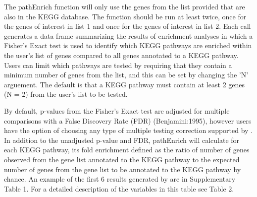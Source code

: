 \documentclass[article]{jss}\usepackage[]{graphicx}\usepackage[]{color}
\begin{document}
The pathEnrich function will only use the genes from the list provided that are
also in the KEGG database. The  function should be run at least
twice, once for the genes of interest in list 1 and once for the genes of
interest in list 2. Each  call generates a data frame
summarizing the results of enrichment analyses in which a Fisher’s Exact test is
used to identify which KEGG pathways are enriched within the user’s list of
genes compared to all genes annotated to a KEGG pathway. Users can limit which
pathways are tested by requiring that they contain a minimum number of genes
from the list, and this can be set by changing the 'N' arguement. The default is
that a KEGG pathway must contain at least 2 genes (N = 2) from the user’s list
to be tested.



By default, p-values from the Fisher’s Exact test are adjusted for multiple
comparisons with a False Discovery Rate (FDR) (Benjamini:1995), however users
have the option of choosing any type of multiple testing correction supported
by . In addition to the unadjusted p-value and FDR, pathEnrich
will calculate for each KEGG pathway, its fold enrichment defined as the ratio
of number of genes observed from the gene list annotated to the KEGG pathway to
the expected number of genes from the gene list to be annotated to the KEGG
pathway by chance. An example of the first 6 results generated by 
are in Supplementary Table 1. For a detailed description of the variables in this table see Table 2.
\end{document}
